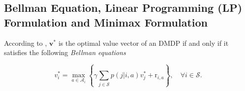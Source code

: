 \documentclass[12pt]{article}
\begin{document}

\subsection{Bellman Equation, Linear Programming (LP) Formulation and Minimax Formulation}


According to \cite{bertsekas2012dynamic,puterman2014markov}, $\boldsymbol{v}^*$ is the optimal value vector of an DMDP if and only if it satisfies the following \textit{Bellman equations}

\begin{equation}
    v_i^* = \max_{a \in \mathcal{A}_i} \left \{\gamma \sum_{j \in \mathcal{S}} p(j|i,a) v_{j}^* + \text{r}_{i,a} \right \},\quad \forall i \in \mathcal{S}.
    \label{eq:bellman-dmdp}
\end{equation}
\end{document}
